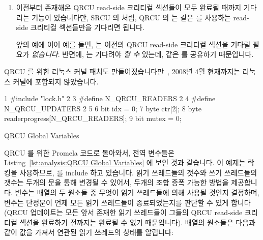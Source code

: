 \begin{enumerate}
\item	이전부터 존재해온 QRCU read-side 크리티컬 섹션들이 모두 완료될 때까지
	기다리는  기능이 있습니다만, SRCU 의
	 처럼, QRCU 의  는 같은
	 를 사용하는 read-side 크리티컬 섹션들만을 기다리면
	됩니다.

	앞의 예에 이어 예를 들면,  는
	이전의 QRCU read-side 크리티컬 섹션을 기다릴 필요가 \emph{없습니다}.
	반면에,  는 기다려야 \emph{할 수}
	있는데, 같은  를 공유하기 때문입니다.
\iffalse

\item	There is a \co{synchronize_qrcu()} primitive that blocks until
	all pre-existing QRCU read-side critical sections complete,
	but, like SRCU's \co{synchronize_srcu()}, QRCU's
	\co{synchronize_qrcu()} need wait only for those read-side
	critical sections that are using the same \co{qrcu_struct}.

	For example, \co{synchronize_qrcu(&your_qrcu_struct)}
	would \emph{not} need to wait on the earlier QRCU read-side
	critical section.
	In contrast, \co{synchronize_qrcu(&my_qrcu_struct)}
	\emph{would} need to wait, since it shares the same
	\co{qrcu_struct}.
\fi
\end{enumerate}

QRCU 를 위한 리눅스 커널 패치도
만들어졌습니다만~\cite{PaulMcKenney2007QRCUpatch}, 2008년 4월 현재까지는 리눅스
커널에 포함되지 않았습니다.
\iffalse

A Linux-kernel patch for QRCU has been
produced~\cite{PaulMcKenney2007QRCUpatch},
but has not yet been included in the Linux kernel as of
April 2008.
\fi

\begin{listing}[htbp]
{ \scriptsize
\begin{verbbox}
  1 #include "lock.h"
  2
  3 #define N_QRCU_READERS 2
  4 #define N_QRCU_UPDATERS 2
  5
  6 bit idx = 0;
  7 byte ctr[2];
  8 byte readerprogress[N_QRCU_READERS];
  9 bit mutex = 0;
\end{verbbox}
}
\centering
\theverbbox
\caption{QRCU Global Variables}
\label{lst:analysis:QRCU Global Variables}
\end{listing}

QRCU 를 위한 Promela 코드로 돌아와서, 전역 변수들은
Listing~\ref{lst:analysis:QRCU Global Variables} 에 보인 것과 같습니다.
이 예제는 락킹을 사용하므로,  를 include 하고 있습니다.
읽기 쓰레드들의 갯수와 쓰기 쓰레드들의 갯수는 두개의  문을 통해
변경될 수 있어서, 두개의 조합 증폭 가능한 방법을 제공합니다.
 변수는  배열의 두 원소들 중 무엇이 읽기 쓰레드들에 의해 사용될
것인지 결정하며,  변수는 단정문이 언제 모든 읽기 쓰레드들이
종료되었는지를 판단할 수 있게 합니다 (QRCU 업데이트는 모든 앞서 존재한 읽기
쓰레드들이 그들의 QRCU read-side 크리티컬 섹션을 완료하기 전까지는 완료될 수
없기 때문입니다).
 배열의 원소들은 다음과 같이 값을 가져서 연관된 읽기
쓰레드의 상태를 알립니다:
\iffalse

